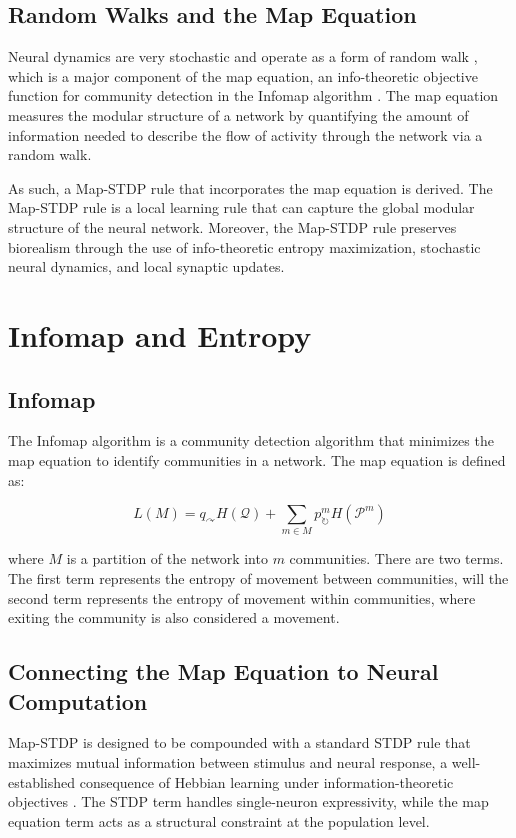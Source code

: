 \documentclass[pdflatex,sn-mathphys-num]{sn-jnl}%
\theoremstyle{thmstyleone}%
\theoremstyle{thmstyletwo}%
\theoremstyle{thmstylethree}%
\begin{document}
\subsection{Random Walks and the Map Equation}

Neural dynamics are very stochastic and operate as a form of random walk \cite{Buesing2011-ka}, which is a major component of the map equation, an info-theoretic objective function for community detection in the Infomap algorithm \cite{Rosvall2008-vf}. The map equation measures the modular structure of a network by quantifying the amount of information needed to describe the flow of activity through the network via a random walk.

As such, a Map-STDP rule that incorporates the map equation is derived. The Map-STDP rule is a local learning rule that can capture the global modular structure of the neural network. Moreover, the Map-STDP rule preserves biorealism through the use of info-theoretic entropy maximization, stochastic neural dynamics, and local synaptic updates.

\section{Infomap and Entropy}

\subsection{Infomap}

The Infomap algorithm is a community detection algorithm that minimizes the map equation to identify communities in a network. The map equation is defined as:

$$L(M) = q_{\curvearrowright} H(\mathcal{Q}) + \sum_{m \in M} p_{\circlearrowright}^{m} H(\mathcal{P}^{m})$$

where $M$ is a partition of the network into $m$ communities. There are two terms. The first term represents the entropy of movement between communities, will the second term represents the entropy of movement within communities, where exiting the community is also considered a movement.

\subsection{Connecting the Map Equation to Neural Computation}

Map-STDP is designed to be compounded with a standard STDP rule that maximizes mutual information between stimulus and neural response, a well-established consequence of Hebbian learning under information-theoretic objectives \cite{dayan2001information}. The STDP term handles single-neuron expressivity, while the map equation term acts as a structural constraint at the population level.
\end{document}

